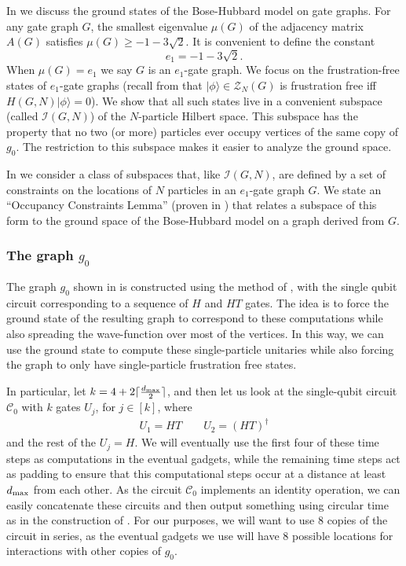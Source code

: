 \documentclass[../thesis-main/thesis-main]{subfiles}
\begin{document}
In  we discuss the ground states of the Bose-Hubbard model on gate graphs. For any gate graph $G$, the smallest eigenvalue $\mu(G)$ of the adjacency matrix $A(G)$ satisfies $\mu(G)\geq-1-3\sqrt{2}$. It is convenient to define the constant
\begin{equation}
e_{1}=-1-3\sqrt{2}.\label{eq:e1_defn}
\end{equation}
When $\mu(G)=e_{1}$ we say $G$ is an $e_{1}$-gate graph. We focus on the frustration-free states of $e_1$-gate graphs (recall from  that $|\phi\rangle\in \mathcal{Z}_N(G)$ is frustration free iff $H(G,N)|\phi\rangle=0$). We show that all such states live in a convenient subspace (called $\mathcal{I}(G,N)$) of the $N$-particle Hilbert space. This subspace has the property that no two (or more) particles ever occupy vertices of the same copy of $g_{0}$. The restriction to this subspace makes it easier to analyze the ground space.

In  we consider a class of subspaces that, like $\mathcal{I}(G,N)$, are defined by a set of constraints on the locations of $N$ particles in an $e_{1}$-gate graph $G$. We state an ``Occupancy Constraints Lemma'' (proven in ) that relates a subspace of this form to the ground space of the Bose-Hubbard model on a graph derived from $G$.


\subsubsection{The graph $g_0$}\label{sec:g_0_graph}

The graph $g_{0}$ shown in  is constructed using the method of , with the single qubit circuit corresponding to a sequence of $H$ and $HT$ gates.  The idea is to force the ground state of the resulting graph to correspond to these computations while also spreading the wave-function over most of the vertices.  In this way, we can use the ground state to compute these single-particle unitaries while also forcing the graph to only have single-particle frustration free states.

In particular, let $k = 4 + 2 \lceil \frac{d_{\text{max}}}{2}\rceil$, and then let us look at the single-qubit circuit $\mathcal{C}_0$ with $k$ gates $U_j$, for $j\in[k]$, where 
\begin{align}
U_{1}=HT\qquad U_{2}=\left(HT\right)^{\dagger}
\end{align}
and the rest of the $U_j=H$.  We will eventually use the first four of these time steps as computations in the eventual gadgets, while the remaining time steps act as padding to ensure that this computational steps occur at a distance at least $d_{\text{max}}$ from each other.  As the circuit $\mathcal{C}_0$ implements an identity operation, we can easily concatenate these circuits and then output something using circular time as in the construction of .  For our purposes, we will want to use 8 copies of the circuit in series, as the eventual gadgets we use will have 8 possible locations for interactions with other copies of $g_0$.
\end{document}
